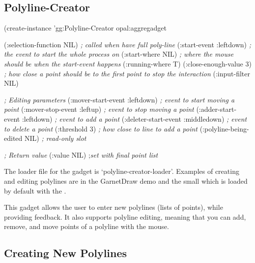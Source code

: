 \begin{group}
\section{Polyline-Creator}
\label{polyline-creator}
 

\begin{center}
\end{center}
\end{group}

\begin{programexample}
(create-instance 'gg:Polyline-Creator opal:aggregadget

    (:selection-function NIL) {\it ; called when have full poly-line}
    (:start-event :leftdown)  {\it ; the event to start the whole process on}
    (:start-where NIL)        {\it ; where the mouse should be when the start-event happens}
    (:running-where T)
    (:close-enough-value 3)   {\it ; how close a point should be to the first point to stop the interaction}
    (:input-filter NIL)

    {\it ; Editing parameters}
    (:mover-start-event :leftdown)      {\it ; event to start moving a point}
    (:mover-stop-event :leftup)         {\it ; event to stop moving a point}
    (:adder-start-event :leftdown)      {\it ; event to add a point}
    (:deleter-start-event :middledown)  {\it ; event to delete a point}
    (:threshold 3)                      {\it ; how close to line to add a point}
    (:polyline-being-edited NIL)        {\it ; read-only slot}

    {\it ; Return value}
    (:value NIL) ;{\it set with final point list}
\end{programexample}

The loader file for the  gadget is
`polyline-creator-loader'.
Examples of creating and editing polylines are in the GarnetDraw demo and the
small  which is loaded by default with
the .


This gadget allows the user to enter new polylines (lists of points), while
providing feedback.  It also supports polyline editing, meaning that
you can add, remove, and move points of a polyline with the mouse.

\subsection{Creating New Polylines}

